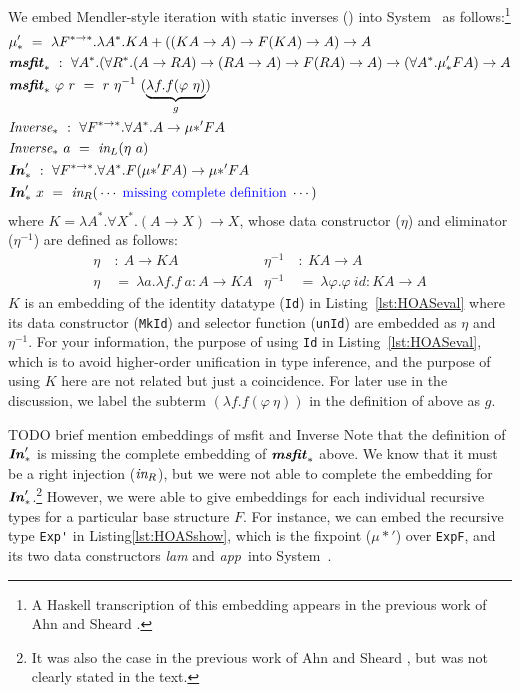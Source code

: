 We embed Mendler-style iteration with static inverses (\msfit{*})
into System \Fw\ as follows:\footnote{A Haskell transcription of this embedding
	appears in the previous work of Ahn and Sheard \cite{AhnShe11}.}
\begin{align*}
&\mu_{*}' ~=~ \lambda F^{* \to *}.\lambda A^{*}.
		K A + ((K A \to A) \to F(K A) \to A) \to A
	\\
&\textbf{\textit{msfit}}_{*} ~:~ \forall A^{*}.
	(\forall R^{*}.(A \to R A) \to (R A \to A) \to F(R A) \to A) \to
	(\forall A^{*}.\mu_{*}' F A) \to A \\
&\textbf{\textit{msfit}}_{*}~\varphi~r ~=~ r~\eta^{-1}~(\underbrace{\lambda f.f(\varphi~\eta)}_g)
	\\
&\textit{Inverse}_{*} ~:~ \forall F^{*\to*}.\forall A^{*}.A \to \mu{*}' F A \\
&\textit{Inverse}_{*}~a ~=~ \textit{in}_{L} (\eta~a)
	\\
&\textbf{\textit{In}}_{*}' ~:~ \forall F^{*\to*}.\forall A^{*}.F(\mu{*}' F A) \to \mu{*}' F A \\
&\textbf{\textit{In}}_{*}'~x ~=~ \textit{in}_{R}(\,\cdots\;\text{\color{blue}missing complete definition}\;\cdots)
\end{align*}
where $K = \lambda A^{*}.\forall X^{*}.(A \to X) \to X$,
whose data constructor ($\eta$) and eliminator ($\eta^{-1}$)
are defined as follows:
\begin{align*}
\eta &~:~ A \to KA &
\eta^{-1} &~:~ KA \to A \\
\eta &~=~ \lambda a.\lambda f.f~a : A \to KA &
\eta^{-1} &~=~ \lambda \varphi.\varphi~\textit{id} : KA \to A
\end{align*}
$K$ is an embedding of the identity datatype (\lstinline{Id})
in Listing~\ref{lst:HOASeval} where its data constructor (\lstinline{MkId}) and
selector function (\lstinline{unId}) are embedded as $\eta$ and $\eta^{-1}$.
For your information, the purpose of using \lstinline{Id}
in Listing~\ref{lst:HOASeval}, which is to avoid higher-order unification
in type inference, and the purpose of using $K$ here are not related but
just a coincidence. For later use in the discussion, we label the subterm
$(\lambda f.f(\varphi~\eta))$ in the definition of \msfit{*} above as $g$.

TODO brief mention embeddings of msfit and Inverse
Note that the definition of $\textbf{\textit{In}}_{*}'$ is missing the complete embedding of
$\textbf{\textit{msfit}}_{*}$ above. We know that it must be a right injection ($\textit{in}_{R}$), but
we were not able to complete the embedding for $\textbf{\textit{In}}_{*}'$.\footnote{
	It was also the case in the previous work of Ahn and Sheard
	\cite{AhnShe11}, but was not clearly stated in the text.}
However, we were able to give embeddings for each individual recursive types
for a particular base structure $F$. For instance, we can embed
the recursive type \lstinline{Exp'} in Listing\;\ref{lst:HOASshow},
which is the fixpoint ($\mu{*}'$) over \lstinline{ExpF}, and
its two data constructors \textit{lam} and \textit{app}\, into System~\Fw.

